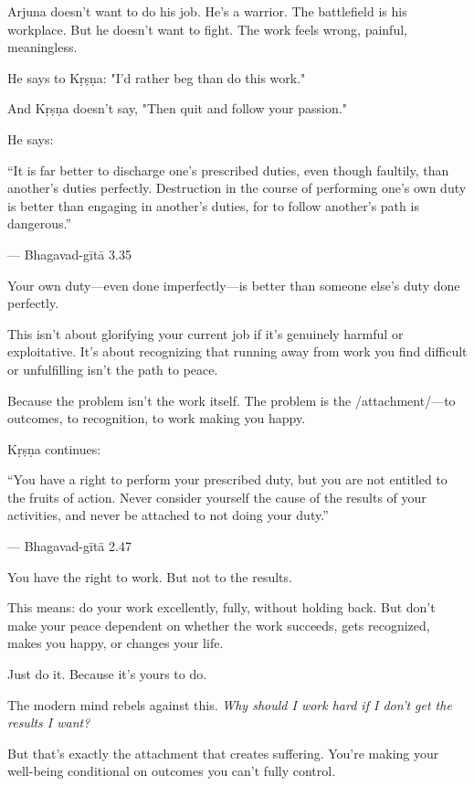 \documentclass[11pt,twoside]{book}
\begin{document}
Arjuna doesn't want to do his job. He's a warrior. The battlefield is his workplace. But he doesn't want to fight. The work feels wrong, painful, meaningless.

He says to Kṛṣṇa: "I'd rather beg than do this work."

And Kṛṣṇa doesn't say, "Then quit and follow your passion."

He says:

\begin{pullquote}
``It is far better to discharge one's prescribed duties, even though faultily, than another's duties perfectly. Destruction in the course of performing one's own duty is better than engaging in another's duties, for to follow another's path is dangerous.''

--- Bhagavad-gītā 3.35
\end{pullquote}

Your own duty—even done imperfectly—is better than someone else's duty done perfectly.

This isn't about glorifying your current job if it's genuinely harmful or exploitative. It's about recognizing that running away from work you find difficult or unfulfilling isn't the path to peace.

Because the problem isn't the work itself. The problem is the /attachment/—to outcomes, to recognition, to work making you happy.

Kṛṣṇa continues:

\begin{pullquote}
``You have a right to perform your prescribed duty, but you are not entitled to the fruits of action. Never consider yourself the cause of the results of your activities, and never be attached to not doing your duty.''

--- Bhagavad-gītā 2.47
\end{pullquote}

You have the right to work. But not to the results.

This means: do your work excellently, fully, without holding back. But don't make your peace dependent on whether the work succeeds, gets recognized, makes you happy, or changes your life.

Just do it. Because it's yours to do.

The modern mind rebels against this. \emph{Why should I work hard if I don't get the results I want?}

But that's exactly the attachment that creates suffering. You're making your well-being conditional on outcomes you can't fully control.
\end{document}
